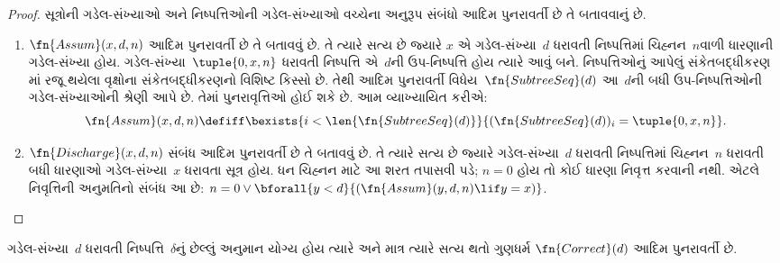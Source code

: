 \begin{proof}
  સૂત્રોની ગડેલ-સંખ્યાઓ અને
  નિષ્પત્તિઓની ગડેલ-સંખ્યાઓ વચ્ચેના
  અનુરૂપ સંબંધો આદિમ પુનરાવર્તી છે
  તે બતાવવાનું છે.
  \begin{enumerate}
  \item $\fn{Assum}(x, d, n)$ આદિમ
    પુનરાવર્તી છે તે બતાવવું છે. તે
    ત્યારે સત્ય છે જ્યારે $x$ એ
    ગડેલ-સંખ્યા~$d$ ધરાવતી
    નિષ્પત્તિમાં ચિહ્નન~$n$વાળી
    ધારણાની ગડેલ-સંખ્યા હોય.
    ગડેલ-સંખ્યા~$\tuple{0, x,
      n}$ ધરાવતી નિષ્પત્તિ એ~$d$ની
    ઉપ-નિષ્પત્તિ હોય ત્યારે આવું બને.
    નિષ્પત્તિઓનું આપેલું
    સંકેતબદ્ધીકરણ
    માં રજૂ થયેલા
    વૃક્ષોના સંકેતબદ્ધીકરણનો વિશિષ્ટ
    કિસ્સો છે. તેથી આદિમ પુનરાવર્તી
    વિધેય~$\fn{SubtreeSeq}(d)$ આ~$d$ની
    બધી ઉપ-નિષ્પત્તિઓની ગડેલ-સંખ્યાઓની
    શ્રેણી આપે છે. તેમાં પુનરાવૃત્તિઓ હોઈ શકે છે.
    આમ વ્યાખ્યાયિત કરીએ:
    \[
    \fn{Assum}(x, d, n) \defiff \bexists{i<\len{\fn{SubtreeSeq}(d)}}{(\fn{SubtreeSeq}(d))_i =
      \tuple{0, x, n}}.
    \]
  \item $\fn{Discharge}(x, d, n)$
    સંબંધ આદિમ પુનરાવર્તી છે તે બતાવવું છે.
    તે ત્યારે સત્ય છે જ્યારે ગડેલ-સંખ્યા~$d$
    ધરાવતી નિષ્પત્તિમાં ચિહ્નન~$n$
    ધરાવતી બધી ધારણાઓ ગડેલ-સંખ્યા~$x$
    ધરાવતા સૂત્ર હોય. ધન ચિહ્નન માટે આ શરત
    તપાસવી પડે; $n=0$ હોય તો કોઈ ધારણા નિવૃત્ત કરવાની નથી.
    એટલે નિવૃત્તિની અનુમતિનો સંબંધ આ છે:
    $n=0 \lor \bforall{y<d}{(\fn{Assum}(y, d, n) \lif y
      = x)}$.
  \end{enumerate}
\end{proof}

\begin{prop}
  ગડેલ-સંખ્યા~$d$ ધરાવતી
  નિષ્પત્તિ~$\delta$નું છેલ્લું
  અનુમાન યોગ્ય હોય ત્યારે અને માત્ર
  ત્યારે સત્ય થતો ગુણધર્મ
  $\fn{Correct}(d)$ આદિમ પુનરાવર્તી છે.
\end{prop}

